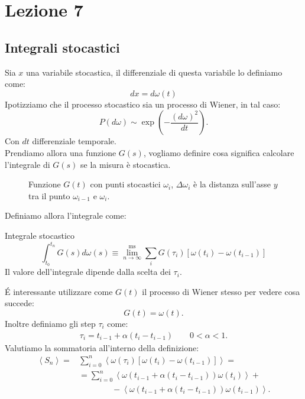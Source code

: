 \section{Lezione 7}%
\label{sub:Lezione 7}

\subsection{Integrali stocastici}%
\label{sub:Integrali stocastici}
Sia $x$ una variabile stocastica, il differenziale di questa variabile lo definiamo come:
\begin{equation}
    dx = d\omega (t) \label{eq:6_int}
\end{equation}
Ipotizziamo che il processo stocastico sia un processo di Wiener, in tal caso:
\[
    P(d\omega) \sim \exp\left(-\frac{\left(d\omega\right)^2}{dt}\right)
.\] 
Con $dt$ differenziale temporale.\\
Prendiamo allora una funzione $G(s)$, vogliamo definire cosa significa calcolare l'integrale di $G(s)$ se la misura è stocastica.
\begin{figure}[H]
    \centering
    \caption{\scriptsize Funzione $G(t)$ con punti stocastici $\omega_i$, $\Delta\omega_i$ è la distanza sull'asse $y$ tra il punto $\omega_{i-1}$ e $\omega_i$.}
    \label{fig:lez_6_int}
\end{figure}
Definiamo allora l'integrale come:
\begin{redbox}{Integrale stocastico}
\[
    \int_{t_0}^{t_n} G(s) d\omega (s) \equiv \lim^{\text{ms}}_{n \to \infty} \sum_{i}^{} G(\tau_i) \left[\omega (t_i) - \omega (t_{i-1}) \right]
\]     
Il valore dell'integrale dipende dalla scelta dei $\tau_i$.
\end{redbox}
\noindent
\'E interessante utilizzare come $G(t)$ il processo di Wiener stesso per vedere cosa succede:
\[
    G(t) = \omega (t) 
.\]
Inoltre definiamo gli step $\tau_i$ come:
\[\begin{aligned}
    \tau_i = t_{i-1} + \alpha (t_i - t_{i-1}) \qquad 0 <\alpha <1 \label{eq:tau}
.\end{aligned}\]
Valutiamo la sommatoria all'interno della definizione:
\[\begin{aligned}
    \left<S_n\right> =& \sum_{i=0}^{n} \left<\omega (\tau_i)\left[ \omega (t_i) - \omega (t_{i-1})  \right] \right>=\\
		      & = \sum_{i=0}^{n} \left<\omega (t_{i-1} +\alpha (t_i-t_{i-1}) ) \omega(t_i) \right> + \\
		  & \qquad \qquad - \left<\omega (t_{i-1} +\alpha (t_i-t_{i-1}) ) \omega(t_{i-1}) \right>
.\end{aligned}\]
